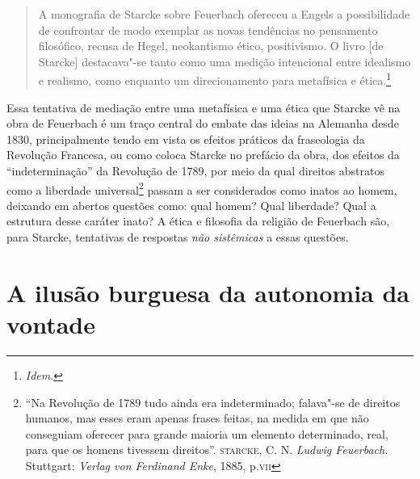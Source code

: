 \begin{quote}
A monografia de Starcke sobre Feuerbach ofereceu a Engels a
possibilidade de confrontar de modo exemplar as novas tendências no
pensamento filosófico, recusa de Hegel, neokantismo ético, positivismo.
O livro {[}de Starcke{]} destacava"-se tanto como uma medição
intencional entre idealismo e realismo, como enquanto um direcionamento
para metafísica e ética.\footnote{\emph{Idem}.}
\end{quote}

Essa tentativa de mediação entre uma metafísica e uma ética que Starcke
vê na obra de Feuerbach é um traço central do embate das ideias na
Alemanha desde 1830, principalmente tendo em vista os efeitos práticos
da fraseologia da Revolução Francesa, ou como coloca Starcke no prefácio
da obra, dos efeitos da ``indeterminação'' da Revolução de 1789, por
meio da qual direitos abstratos como a liberdade universal\footnote{``Na
  Revolução de 1789 tudo ainda era indeterminado; falava"-se de direitos
  humanos, mas esses eram apenas frases feitas, na medida em que não
  conseguiam oferecer para grande maioria um elemento determinado, real,
  para que os homens tivessem direitos''. \textsc{starcke}, C. N.
  \emph{Ludwig Feuerbach.} Stuttgart: \emph{Verlag von Ferdinand Enke},
  1885, p.\textsc{vii}} passam a ser considerados como inatos ao homem,
deixando em abertos questões como: qual homem? Qual liberdade? Qual a
estrutura desse caráter inato? A ética e filosofia da religião de
Feuerbach são, para Starcke, tentativas de respostas \emph{não
sistêmicas} a essas questões.

\section*{A ilusão burguesa da autonomia da vontade}

